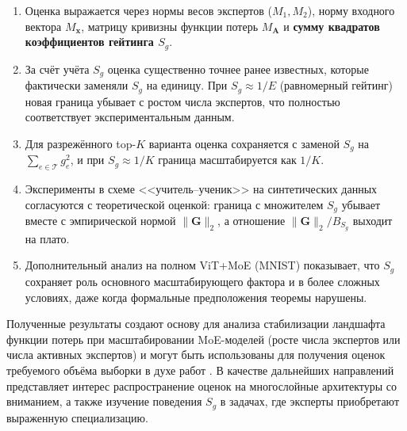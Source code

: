 \documentclass[11pt]{extarticle}
\theoremstyle{definition}
\theoremstyle{plain}
\theoremstyle{remark}
\begin{document}
\begin{enumerate}
    \item Оценка выражается через нормы весов экспертов ($M_1,M_2$),
          норму входного вектора $M_{\mathbf{x}}$,
          матрицу кривизны функции потерь $M_{\mathbf{A}}$
          и \textbf{сумму квадратов коэффициентов гейтинга $S_g$}.
    \item За счёт учёта $S_g$ оценка существенно точнее ранее известных,
          которые фактически заменяли $S_g$ на единицу.
          При $S_g\approx 1/E$ (равномерный гейтинг) новая граница
          убывает с ростом числа экспертов, что полностью соответствует
          экспериментальным данным.
    \item Для разрежённого top-$K$ варианта оценка сохраняется
          с заменой $S_g$ на $\sum_{e\in\mathcal T}g_e^2$,
          и при $S_g\approx 1/K$ граница масштабируется как $1/K$.
    \item Эксперименты в схеме <<учитель--ученик>> на синтетических данных согласуются с теоретической оценкой: граница с множителем $S_g$ убывает вместе с эмпирической нормой $\|\mathbf G\|_2$, а отношение $\|\mathbf G\|_2/B_{S_g}$ выходит на плато.
    \item Дополнительный анализ на полном ViT+MoE (MNIST) показывает, что $S_g$ сохраняет роль основного масштабирующего фактора и в более сложных условиях, даже когда формальные предположения теоремы нарушены.
\end{enumerate}

Полученные результаты создают основу для анализа стабилизации
ландшафта функции потерь при масштабировании MoE-моделей
(росте числа экспертов или числа активных экспертов)
и могут быть использованы для получения оценок требуемого
объёма выборки в духе работ \cite{Kiselev2024, Meshkov2024}.
В качестве дальнейших направлений представляет интерес
распространение оценок на многослойные архитектуры со вниманием,
а также изучение поведения $S_g$ в задачах, где эксперты
приобретают выраженную специализацию.
\end{document}

